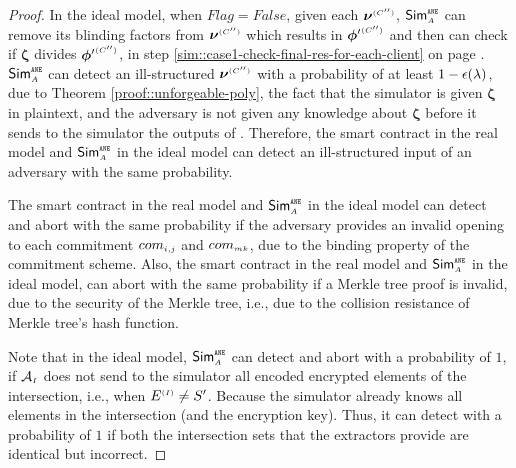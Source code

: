 \begin{proof}
In the ideal model, when $Flag=False$, given each ${\bm\nu}^{ \scriptscriptstyle {  {(C'')}} }$, $\mathsf{Sim}^{\scriptscriptstyle \mathtt{ANE}}_{\scriptscriptstyle A}$ can remove its blinding factors from  ${\bm\nu}^{ \scriptscriptstyle {  {(C'')}} }$ which results in $ {\bm\phi'}^{ \scriptscriptstyle {  {(C'')}} }$ and then can check if ${\bm\zeta}$  divides $ {\bm\phi'}^{ \scriptscriptstyle {  {(C'')}} }$, in step \ref{sim::case1-check-final-res-for-each-client} on page \pageref{sim::case1-check-final-res-for-each-client}. $\mathsf{Sim}^{\scriptscriptstyle \mathtt{ANE}}_{\scriptscriptstyle A}$ can detect an ill-structured  ${\bm\nu}^{ \scriptscriptstyle {  {(C'')}} }$ with a probability of at least $1-\epsilon(\lambda)$, due to Theorem \ref{proof::unforgeable-poly}, the fact that the simulator is given ${\bm \zeta}$ in plaintext,  and the adversary is not given any knowledge about ${\bm \zeta}$ before it sends to the simulator the outputs of \vopr.  Therefore, the smart contract in the real model and $\mathsf{Sim}^{\scriptscriptstyle \mathtt{ANE}}_{\scriptscriptstyle A}$ in the ideal model can detect an ill-structured input of an adversary with the same probability.  

The smart contract in the real model and $\mathsf{Sim}^{\scriptscriptstyle \mathtt{ANE}}_{\scriptscriptstyle A}$ in the ideal model can detect and abort with the same probability if the adversary provides an invalid opening to each commitment $com_{\scriptscriptstyle i,j}$ and $com_{\scriptscriptstyle {mk}}$, due to the binding property of the commitment scheme. Also, the smart contract in the real model and $\mathsf{Sim}^{\scriptscriptstyle \mathtt{ANE}}_{\scriptscriptstyle A}$ in the ideal model, can abort with the same probability if a Merkle tree proof is invalid, due to the security of the Merkle tree, i.e., due to the collision resistance of Merkle tree's hash function. 



Note that in the ideal model, $\mathsf{Sim}^{\scriptscriptstyle \mathtt{ANE}}_{\scriptscriptstyle A}$ can detect and abort with a probability of $1$, if $\mathcal{A}_{\scriptscriptstyle I}$ does not send to the simulator all encoded encrypted elements of the intersection,  i.e., when $E^{\scriptscriptstyle (I)}\neq S'$. Because the simulator already knows all elements in the intersection (and the encryption key). Thus, it can detect with a probability of $1$ if both the intersection sets that the extractors provide are identical but incorrect.   


\end{proof}
